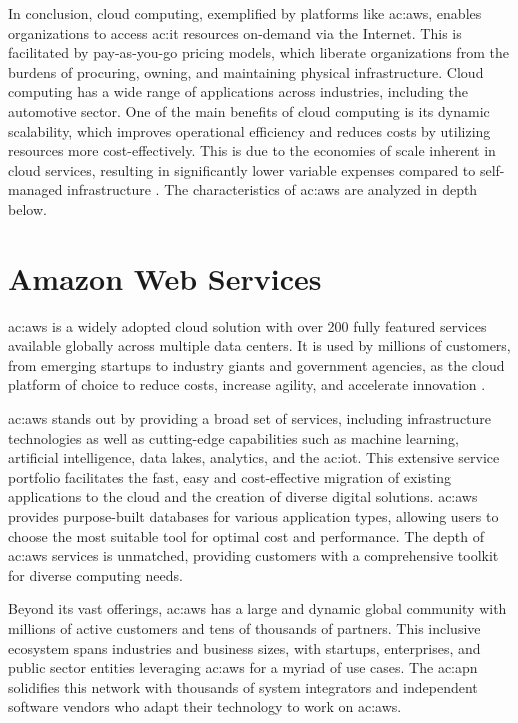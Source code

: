 In conclusion, cloud computing, exemplified by platforms like \gls{ac:aws}, enables organizations to access \gls{ac:it} resources on-demand via the Internet. This is facilitated by pay-as-you-go pricing models, which liberate organizations from the burdens of procuring, owning, and maintaining physical infrastructure. Cloud computing has a wide range of applications across industries, including the automotive sector. One of the main benefits of cloud computing is its dynamic scalability, which improves operational efficiency and reduces costs by utilizing resources more cost-effectively. This is due to the economies of scale inherent in cloud services, resulting in significantly lower variable expenses compared to self-managed infrastructure \cite{AWSWhatIsCloudComputing}. The characteristics of \gls{ac:aws} are analyzed in depth below.

\section{Amazon Web Services}

\gls{ac:aws} is a widely adopted cloud solution with over 200 fully featured services available globally across multiple data centers. It is used by millions of customers, from emerging startups to industry giants and government agencies, as the cloud platform of choice to reduce costs, increase agility, and accelerate innovation \cite{EuAmazonWebServices}.

\gls{ac:aws} stands out by providing a broad set of services, including infrastructure technologies as well as cutting-edge capabilities such as machine learning, artificial intelligence, data lakes, analytics, and the \gls{ac:iot}. This extensive service portfolio facilitates the fast, easy and cost-effective migration of existing applications to the cloud and the creation of diverse digital solutions. \gls{ac:aws} provides purpose-built databases for various application types, allowing users to choose the most suitable tool for optimal cost and performance. The depth of \gls{ac:aws} services is unmatched, providing customers with a comprehensive toolkit for diverse computing needs.

Beyond its vast offerings, \gls{ac:aws} has a large and dynamic global community with millions of active customers and tens of thousands of partners. This inclusive ecosystem spans industries and business sizes, with startups, enterprises, and public sector entities leveraging \gls{ac:aws} for a myriad of use cases. The \gls{ac:apn} solidifies this network with thousands of system integrators and independent software vendors who adapt their technology to work on \gls{ac:aws}.

